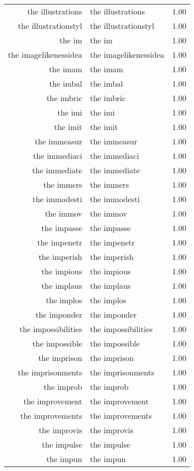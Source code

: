 \begin{table}[ht]
\begin{tabular}{rlr}
  the illustrations & the illustrations & 1.00 \\ 
  the illustrationstyl & the illustrationstyl & 1.00 \\ 
  the im & the im & 1.00 \\ 
  the imagelikenessidea & the imagelikenessidea & 1.00 \\ 
  the imam & the imam & 1.00 \\ 
  the imbal & the imbal & 1.00 \\ 
  the imbric & the imbric & 1.00 \\ 
  the imi & the imi & 1.00 \\ 
  the imit & the imit & 1.00 \\ 
  the immeasur & the immeasur & 1.00 \\ 
  the immediaci & the immediaci & 1.00 \\ 
  the immediate & the immediate & 1.00 \\ 
  the immers & the immers & 1.00 \\ 
  the immodesti & the immodesti & 1.00 \\ 
  the immov & the immov & 1.00 \\ 
  the impasse & the impasse & 1.00 \\ 
  the impenetr & the impenetr & 1.00 \\ 
  the imperish & the imperish & 1.00 \\ 
  the impious & the impious & 1.00 \\ 
  the implaus & the implaus & 1.00 \\ 
  the implos & the implos & 1.00 \\ 
  the imponder & the imponder & 1.00 \\ 
  the impossibilities & the impossibilities & 1.00 \\ 
  the impossible & the impossible & 1.00 \\ 
  the imprison & the imprison & 1.00 \\ 
  the imprisonments & the imprisonments & 1.00 \\ 
  the improb & the improb & 1.00 \\ 
  the improvement & the improvement & 1.00 \\ 
  the improvements & the improvements & 1.00 \\ 
  the improvis & the improvis & 1.00 \\ 
  the impulse & the impulse & 1.00 \\ 
  the impun & the impun & 1.00 \\ 

\end{tabular}
\end{table}
